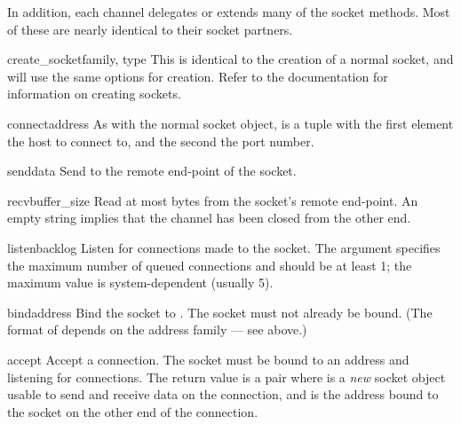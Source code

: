 In addition, each channel delegates or extends many of the socket methods.
Most of these are nearly identical to their socket partners.

\begin{methoddesc}{create_socket}{family, type}
  This is identical to the creation of a normal socket, and 
  will use the same options for creation.  Refer to the
   documentation for information on creating
  sockets.
\end{methoddesc}

\begin{methoddesc}{connect}{address}
  As with the normal socket object,  is a 
  tuple with the first element the host to connect to, and the 
  second the port number.
\end{methoddesc}

\begin{methoddesc}{send}{data}
  Send  to the remote end-point of the socket.
\end{methoddesc}

\begin{methoddesc}{recv}{buffer_size}
  Read at most  bytes from the socket's remote end-point.
  An empty string implies that the channel has been closed from the other
  end.
\end{methoddesc}

\begin{methoddesc}{listen}{backlog}
  Listen for connections made to the socket.  The 
  argument specifies the maximum number of queued connections
  and should be at least 1; the maximum value is
  system-dependent (usually 5).
\end{methoddesc}

\begin{methoddesc}{bind}{address}
  Bind the socket to .  The socket must not already
  be bound.  (The format of  depends on the address
  family --- see above.)
\end{methoddesc}

\begin{methoddesc}{accept}{}
  Accept a connection.  The socket must be bound to an address
  and listening for connections.  The return value is a pair
   where  is a
  \emph{new} socket object usable to send and receive data on
  the connection, and  is the address bound to the
  socket on the other end of the connection.
\end{methoddesc}

